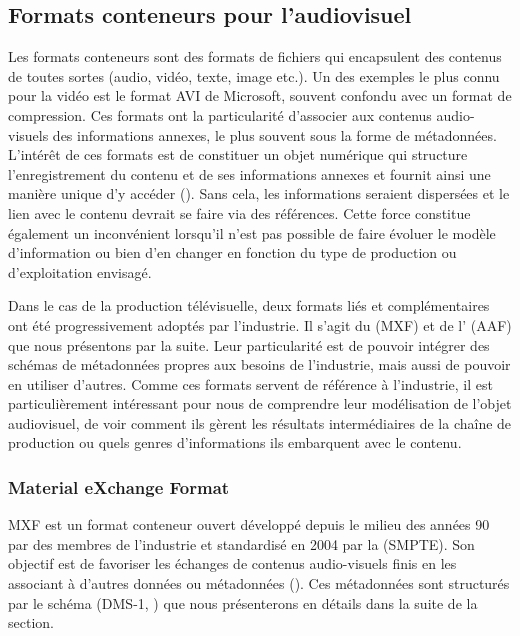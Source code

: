 \subsection{Formats conteneurs pour l'audiovisuel} \label{sec:wrapper}
Les formats conteneurs sont des formats de fichiers qui encapsulent des contenus de toutes sortes (audio, vidéo, texte, image etc.). 
Un des exemples le plus connu pour la vidéo est le format AVI de Microsoft, souvent confondu avec un format de compression. 
Ces formats ont la particularité d'associer aux contenus audio-visuels des informations annexes, le plus souvent sous la forme de métadonnées.
L'intérêt de ces formats est de constituer un objet numérique qui structure l'enregistrement du contenu et de ses informations annexes et fournit ainsi une manière unique d'y accéder (\cite{Ferreira2010}).
Sans cela, les informations seraient dispersées et le lien avec le contenu devrait se faire via des références. 
Cette force constitue également un inconvénient lorsqu'il n'est pas possible de faire évoluer le modèle d'information ou bien d'en changer en fonction du type de production ou d'exploitation envisagé.

Dans le cas de la production télévisuelle, deux formats liés et complémentaires ont été progressivement adoptés par l'industrie.  
Il s'agit du  (MXF) et de l' (AAF) que nous présentons par la suite. 
Leur particularité est de pouvoir intégrer des schémas de métadonnées propres aux besoins de l'industrie, mais aussi de pouvoir en utiliser d'autres. 
Comme ces formats servent de référence à l'industrie, il est particulièrement intéressant pour nous de comprendre leur modélisation de l'objet audiovisuel, de voir comment ils gèrent les résultats intermédiaires de la chaîne de production ou quels genres d'informations ils embarquent avec le contenu.


\subsubsection{Material eXchange Format}
MXF est un format conteneur ouvert développé depuis le milieu des années 90 par des membres de l'industrie et standardisé en 2004 par la  (SMPTE).
Son objectif est de favoriser les échanges de contenus audio-visuels finis en les associant à d'autres données ou métadonnées (\cite{Devlin2002}).
Ces métadonnées sont structurés par le schéma  (DMS-1, ) que nous présenterons en détails dans la suite de la section. 

